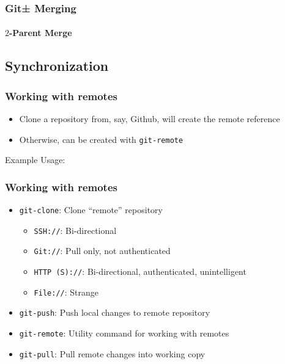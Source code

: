 \documentclass{beamer}
\begin{document}
\begin{frame}
\frametitle{Git± Merging}
\framesubtitle{$2$-Parent Merge}
\begin{figure}
\end{figure}
\end{frame}

\subsection{Synchronization}
\begin{frame}[fragile]
\frametitle{Working with remotes}
\begin{itemize}
\item{Clone a repository from, say, Github, will create the remote reference}
\item{Otherwise, can be created with \texttt{git-remote}}
\end{itemize}
Example Usage:

\end{frame}

\begin{frame}
\frametitle{Working with remotes}
\begin{itemize}
\item{\texttt{git-clone}: Clone ``remote'' repository}
\begin{itemize}
\item{\texttt{SSH://}: Bi-directional}
\item{\texttt{Git://}: Pull only, not authenticated}
\item{\texttt{HTTP (S)://}: Bi-directional, authenticated, unintelligent}
\item{\texttt{File://}: Strange}
\end{itemize}
\item{\texttt{git-push}: Push local changes to remote repository}
\item{\texttt{git-remote}: Utility command for working with remotes}
\item{\texttt{git-pull}: Pull remote changes into working copy}
\end{itemize}
\end{frame}
\end{document}
